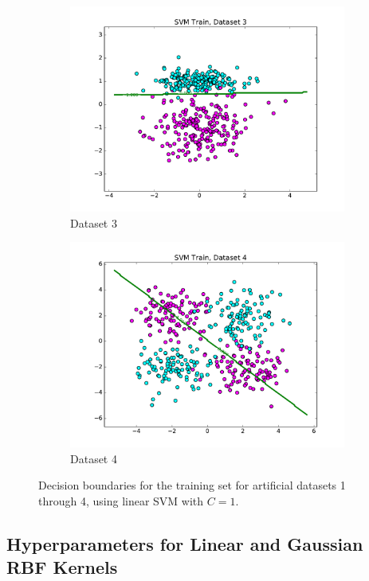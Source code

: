 \documentclass[10pt,psamsfonts]{amsart}
\theoremstyle{definition}
\theoremstyle{remark}
\numberwithin{equation}{section}
\begin{document}
\begin{figure}
\begin{subfigure}[b]{0.23\textwidth}
		\includegraphics[width=\textwidth]{hw2_2-2_3_train.pdf}
		\caption{Dataset 3}
	\end{subfigure}
	\begin{subfigure}[b]{0.23\textwidth}
		\includegraphics[width=\textwidth]{hw2_2-2_4_train.pdf}
		\caption{Dataset 4}
	\end{subfigure}
	\caption{Decision boundaries for the training set for artificial datasets 1 through 4, using linear SVM with $C = 1$.}
\end{figure}

\subsection{Hyperparameters for Linear and Gaussian RBF Kernels}
\end{document}

